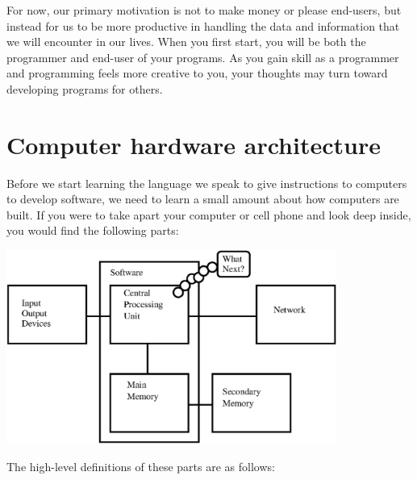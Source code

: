 \documentclass[10pt]{book}
\begin{document}
For now, our primary motivation is not to make money or please end-users, but
instead for us to be more productive in handling the data and 
information that we will encounter in our lives.
When you first start, you will be both the programmer and end-user of
your programs.  As you gain skill as a programmer and
programming feels more creative to you, your thoughts may turn
toward developing programs for others.

\section{Computer hardware architecture}

Before we start learning the language we 
speak to give instructions to computers to 
develop software, we need to learn a small amount about 
how computers are built.  If you were to take
apart your computer or cell phone and look deep
inside, you would find the following parts:

\beforefig
\centerline{\includegraphics[height=2.50in]{figs2/arch.eps}}
\afterfig

The high-level definitions of these parts are as follows:
\end{document}
